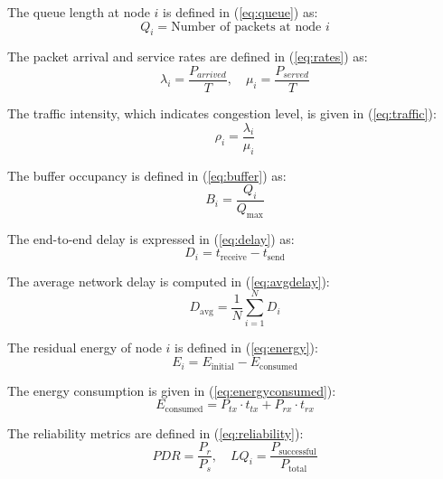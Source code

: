 \documentclass[a4paper,fleqn]{cas-dc}
\numberwithin{equation}{section}
\begin{document}
The queue length at node $i$ is defined in (\ref{eq:queue}) as:
\begin{equation}
Q_i = \text{Number of packets at node } i
\label{eq:queue}
\end{equation}

The packet arrival and service rates are defined in (\ref{eq:rates}) as:
\begin{equation}
\lambda_i = \frac{P_{arrived}}{T}, \quad 
\mu_i = \frac{P_{served}}{T}
\label{eq:rates}
\end{equation}

The traffic intensity, which indicates congestion level, is given in (\ref{eq:traffic}):
\begin{equation}
\rho_i = \frac{\lambda_i}{\mu_i}
\label{eq:traffic}
\end{equation}

The buffer occupancy is defined in (\ref{eq:buffer}) as:
\begin{equation}
B_i = \frac{Q_i}{Q_{\max}}
\label{eq:buffer}
\end{equation}

The end-to-end delay is expressed in (\ref{eq:delay}) as:
\begin{equation}
D_i = t_{\text{receive}} - t_{\text{send}}
\label{eq:delay}
\end{equation}

The average network delay is computed in (\ref{eq:avgdelay}):
\begin{equation}
D_{\text{avg}} = \frac{1}{N} \sum_{i=1}^{N} D_i
\label{eq:avgdelay}
\end{equation}

The residual energy of node $i$ is defined in (\ref{eq:energy}):
\begin{equation}
E_i = E_{\text{initial}} - E_{\text{consumed}}
\label{eq:energy}
\end{equation}

The energy consumption is given in (\ref{eq:energyconsumed}):
\begin{equation}
E_{\text{consumed}} = P_{tx} \cdot t_{tx} + P_{rx} \cdot t_{rx}
\label{eq:energyconsumed}
\end{equation}

The reliability metrics are defined in (\ref{eq:reliability}):
\begin{equation}
PDR = \frac{P_r}{P_s}, \quad 
LQ_i = \frac{P_{\text{successful}}}{P_{\text{total}}}
\label{eq:reliability}
\end{equation}
\end{document}
